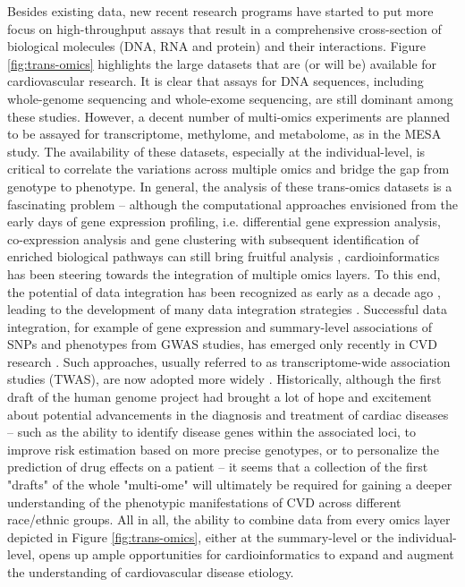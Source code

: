 \documentclass[letter]{bioinfo}
\begin{document}
	
	Besides existing data, new recent research programs have started to put more focus on high-throughput assays that result in a comprehensive cross-section of biological molecules (DNA, RNA and protein) and their interactions.  Figure \ref{fig:trans-omics} highlights the large datasets that are (or will be) available for cardiovascular research. It is clear that assays for DNA sequences, including whole-genome sequencing and whole-exome sequencing, are still dominant among these studies. However, a decent number of multi-omics experiments are planned to be assayed for transcriptome, methylome, and metabolome, as in the MESA study. The availability of these datasets, especially at the individual-level, is critical to correlate the variations across multiple omics and bridge the gap from genotype to phenotype.  In general, the analysis of these trans-omics datasets is a fascinating problem -- although the computational approaches envisioned from the early days of gene expression profiling, i.e. differential gene expression analysis, co-expression analysis and gene clustering with subsequent identification of enriched biological pathways \citep{Claverie:1999:Computational} can still bring fruitful analysis \citep{Santolini:2018:personalized}, cardioinformatics has been steering towards the integration of multiple omics layers. To this end, the potential of data integration has been recognized as early as a decade ago \cite{Hawkins:2010:Nextgeneration}, leading to the development of many data integration strategies \citep{Ritchie:2015:Methods}. Successful data integration, for example of gene expression and summary-level associations of SNPs and phenotypes from GWAS studies, has emerged only recently in CVD research \citep{Gusev:2016:Integrative}. Such approaches, usually referred to as transcriptome-wide association studies (TWAS), are now adopted more widely \citep{Klarin:2018:Genetics}.  Historically, although the first draft of the human genome project had brought a lot of hope and excitement about potential advancements in the diagnosis and treatment of cardiac diseases -- such as the ability to identify disease genes within the associated loci, to improve risk estimation based on more precise genotypes, or to personalize the prediction of drug effects on a patient \citep{Komajda:2001:heart} -- it seems that a collection of the first "drafts" of the whole "multi-ome" will ultimately be required for gaining a deeper understanding of the phenotypic manifestations of CVD across different race/ethnic groups.  All in all, the ability to combine data from every omics layer depicted in Figure \ref{fig:trans-omics}, either at the summary-level or the individual-level, opens up ample opportunities for cardioinformatics to expand and augment the understanding of cardiovascular disease etiology.
	
\end{document}
